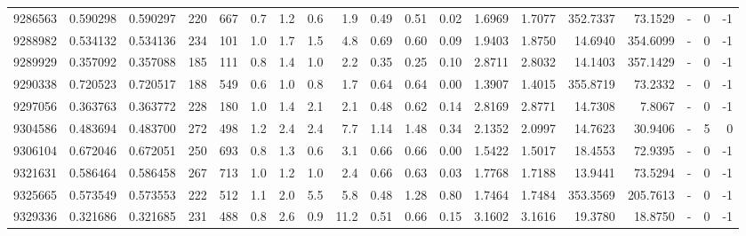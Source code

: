 \begin{tabular}{rrrrrrrrrrrrrrrrlrr}
   9286563 & 0.590298 &   0.590297 &  220 &  667 &      0.7 &      1.2 &     0.6 &      1.9 &       0.49 &        0.51 &        0.02 &  1.6969 &  1.7077 &  352.7337 &   73.1529 &             - &        0 &         -1 \\
   9288982 & 0.534132 &   0.534136 &  234 &  101 &      1.0 &      1.7 &     1.5 &      4.8 &       0.69 &        0.60 &        0.09 &  1.9403 &  1.8750 &   14.6940 &  354.6099 &             - &        0 &         -1 \\
   9289929 & 0.357092 &   0.357088 &  185 &  111 &      0.8 &      1.4 &     1.0 &      2.2 &       0.35 &        0.25 &        0.10 &  2.8711 &  2.8032 &   14.1403 &  357.1429 &             - &        0 &         -1 \\
   9290338 & 0.720523 &   0.720517 &  188 &  549 &      0.6 &      1.0 &     0.8 &      1.7 &       0.64 &        0.64 &        0.00 &  1.3907 &  1.4015 &  355.8719 &   73.2332 &             - &        0 &         -1 \\
   9297056 & 0.363763 &   0.363772 &  228 &  180 &      1.0 &      1.4 &     2.1 &      2.1 &       0.48 &        0.62 &        0.14 &  2.8169 &  2.8771 &   14.7308 &    7.8067 &             - &        0 &         -1 \\
   9304586 & 0.483694 &   0.483700 &  272 &  498 &      1.2 &      2.4 &     2.4 &      7.7 &       1.14 &        1.48 &        0.34 &  2.1352 &  2.0997 &   14.7623 &   30.9406 &             - &        5 &          0 \\
   9306104 & 0.672046 &   0.672051 &  250 &  693 &      0.8 &      1.3 &     0.6 &      3.1 &       0.66 &        0.66 &        0.00 &  1.5422 &  1.5017 &   18.4553 &   72.9395 &             - &        0 &         -1 \\
   9321631 & 0.586464 &   0.586458 &  267 &  713 &      1.0 &      1.2 &     1.0 &      2.4 &       0.66 &        0.63 &        0.03 &  1.7768 &  1.7188 &   13.9441 &   73.5294 &             - &        0 &         -1 \\
   9325665 & 0.573549 &   0.573553 &  222 &  512 &      1.1 &      2.0 &     5.5 &      5.8 &       0.48 &        1.28 &        0.80 &  1.7464 &  1.7484 &  353.3569 &  205.7613 &             - &        0 &         -1 \\
   9329336 & 0.321686 &   0.321685 &  231 &  488 &      0.8 &      2.6 &     0.9 &     11.2 &       0.51 &        0.66 &        0.15 &  3.1602 &  3.1616 &   19.3780 &   18.8750 &             - &        0 &         -1 \\

\end{tabular}
